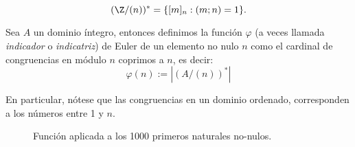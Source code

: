 \documentclass[11pt,oneside]{book}
\begin{document}
$$(\Z/(n))^*=\{[m]_n:(m;n)=1\}.$$
\begin{mydef}
Sea $A$ un dominio íntegro, entonces definimos la función $\varphi$ (a veces llamada \textit{indicador} o \textit{indicatriz}) de Euler de un elemento no nulo $n$ como el cardinal de congruencias en módulo $n$ coprimos a $n$, es decir:
$$\varphi(n):=|(A/(n))^*|$$ 
\end{mydef}
En particular, nótese que las congruencias en un dominio ordenado, corresponden a los números entre 1 y $n$.
\begin{figure}
\centering
{}
\caption{Función aplicada a los 1000 primeros naturales no-nulos.}\label{fig:euler-phi-function}
\end{figure}
\end{document}
